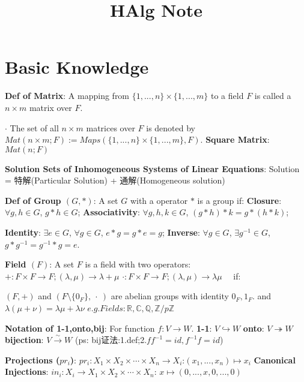 \documentclass[9pt]{article}
\title{HAlg Note}
\author{}
\date{}
\newcommand{\oto}{\hookrightarrow}
\newcommand{\onto}{\twoheadrightarrow}
\newcommand{\bij}{\stackrel{\sim}{\rightarrow}}
\begin{document}
\maketitle
\thispagestyle{fancy}
\vspace{-3.5cm}

\fontsize{10pt}{11pt}\selectfont
\setlength{\parindent}{8pt}


\section{Basic Knowledge} %

\textbf{Def of Matrix}: A mapping from $\{1,...,n\}\times\{1,...,m\}$ to a field $F$ is called a $n\times m$ matrix over $F$.

$\cdot$ The set of all $n\times m$ matrices over $F$ is denoted by $Mat(n\times m;F):=Maps(\{1,...,n\}\times\{1,...,m\},F)$. \quad \textbf{Square Matrix}: $Mat(n;F)$

\textbf{Solution Sets of Inhomogeneous Systems of Linear Equations}: {\small Solution = 特解(Particular Solution) + 通解(Homogeneous solution)}

\textbf{Def of Group $(G,*)$}: A set $G$ with a operator $*$ is a group if: {\small \textbf{Closure}: $\forall g,h\in G$, $g*h\in G$; \textbf{Associativity}: $\forall g,h,k\in G$, $(g*h)*k=g*(h*k)$;}

\hspace{85pt} {\small \textbf{Identity}: $\exists e\in G$, $\forall g\in G$, $e*g=g*e=g$; \textbf{Inverse}: $\forall g\in G$, $\exists g^{-1}\in G$, $g*g^{-1}=g^{-1}*g=e$.} 

\textbf{Field $(F)$}: A set $F$ is a field with two operators: $+:F\times F\to F;(\lambda,\mu)\to\lambda+\mu$ $\cdot:F\times F\to F;(\lambda,\mu)\to\lambda\mu$ \ \ if:

\quad \quad \quad \quad $(F,+)$ and $(F\setminus\{0_F\}, \ \cdot \ )$ are abelian groups with identity $0_F,1_F$. \quad and \quad $\lambda(\mu+\nu)=\lambda\mu+\lambda\nu$ \quad \quad $e.g. Fields:\mathbb{R},\mathbb{C},\mathbb{Q},\mathbb{Z}/p\mathbb{Z}$

\textbf{Notation of 1-1,onto,bij}: For function $f:V\to W$. \quad \textbf{1-1}: $V\oto W$ \quad \textbf{onto}: $V\onto  W$ \quad \textbf{bijection}: $V\bij W$ {\tiny (ps: bij证法:1.def;2.$f f^{-1}=id,f^{-1}f=id$)}

\textbf{Projections ($pr_i$)}: {\small $pr_i:X_1\times X_2\times\cdots\times X_n \to X_i$:$(x_1,...,x_n)\mapsto x_i$} \quad \textbf{Canonical Injections}: {\small $in_i:X_i\to X_1\times X_2\times\cdots\times X_n$: $x\mapsto (0,...,x,0,...,0)$}
\end{document}
